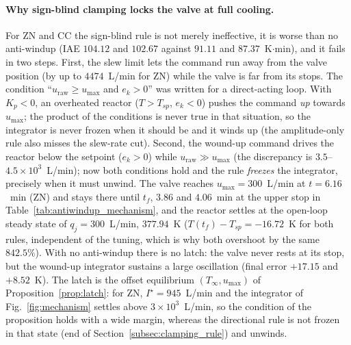 \documentclass[11pt]{article}
\begin{document}
\paragraph{Why sign-blind clamping locks the valve at full cooling.} For ZN and CC the sign-blind rule is not merely ineffective, it is worse than no anti-windup (IAE $104.12$ and $102.67$ against $91.11$ and $87.37$~K$\cdot$min), and it fails in two steps. First, the slew limit lets the command run away from the valve position (by up to $4474$~L/min for ZN) while the valve is far from its stops. The condition ``$u_{\text{raw}} \ge u_{\max}$ and $e_k > 0$'' was written for a direct-acting loop. With $K_p < 0$, an overheated reactor ($T > T_{sp}$, $e_k < 0$) pushes the command \emph{up} towards $u_{\max}$; the product of the conditions is never true in that situation, so the integrator is never frozen when it should be and it winds up (the amplitude-only rule also misses the slew-rate cut). Second, the wound-up command drives the reactor below the setpoint ($e_k > 0$) while $u_{\text{raw}} \gg u_{\max}$ (the discrepancy is $3.5$--$4.5\times 10^{3}$~L/min); now both conditions hold and the rule \emph{freezes} the integrator, precisely when it must unwind. The valve reaches $u_{\max} = 300$~L/min at $t = 6.16$~min (ZN) and stays there until $t_f$, $3.86$ and $4.06$~min at the upper stop in Table~\ref{tab:antiwindup_mechanism}, and the reactor settles at the open-loop steady state of $q_j = 300$~L/min, $377.94$~K ($T(t_f) - T_{sp} = -16.72$~K for both rules, independent of the tuning, which is why both overshoot by the same $842.5\%$). With no anti-windup there is no latch: the valve never rests at its stop, but the wound-up integrator sustains a large oscillation (final error $+17.15$ and $+8.52$~K). The latch is the offset equilibrium $(T_\infty, u_{\max})$ of Proposition~\ref{prop:latch}: for ZN, $I^\star = 945$~L/min and the integrator of Fig.~\ref{fig:mechanism} settles above $3\times10^{3}$~L/min, so the condition of the proposition holds with a wide margin, whereas the directional rule is not frozen in that state (end of Section~\ref{subsec:clamping_rule}) and unwinds.
\end{document}
